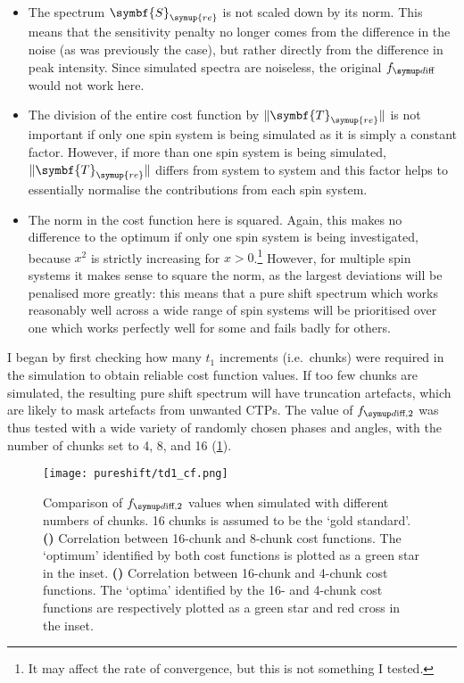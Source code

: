 \begin{itemize}
    \item The spectrum $\symbf{S}_{\symup{re}}$ is not scaled down by its norm. This means that the sensitivity penalty no longer comes from the difference in the noise (as was previously the case), but rather directly from the difference in peak intensity.
        Since simulated spectra are noiseless, the original $\fdiff$ would not work here.
    \item The division of the entire cost function by $\lVert\symbf{T}_{\symup{re}}\rVert$ is not important if only one spin system is being simulated as it is simply a constant factor.
        However, if more than one spin system is being simulated, $\lVert\symbf{T}_{\symup{re}}\rVert$ differs from system to system and this factor helps to essentially normalise the contributions from each spin system.
    \item The norm in the cost function here is squared.
        Again, this makes no difference to the optimum if only one spin system is being investigated, because $x^2$ is strictly increasing for $x > 0$.\footnote{It may affect the rate of convergence, but this is not something I tested.}
        However, for multiple spin systems it makes sense to square the norm, as the largest deviations will be penalised more greatly: this means that a pure shift spectrum which works reasonably well across a wide range of spin systems will be prioritised over one which works perfectly well for some and fails badly for others.
\end{itemize}

I began by first checking how many $t_1$ increments (i.e.\ chunks) were required in the simulation to obtain reliable cost function values.
If too few chunks are simulated, the resulting pure shift spectrum will have truncation artefacts, which are likely to mask artefacts from unwanted CTPs.
The value of $\fdifftwo$ was thus tested with a wide variety of randomly chosen phases and angles, with the number of chunks set to 4, 8, and 16 (\cref{fig:dpsyche_td1_cf}).

\begin{figure}[htb]
    \centering
    \texttt{[image: pureshift/td1\_cf.png]}%
    {\label{fig:dpsyche_td1_cf_16_8}}%
    {\label{fig:dpsyche_td1_cf_16_4}}%
    \caption[Comparison of $\fdifftwo$ cost function with different numbers of chunks]{
        Comparison of $\fdifftwo$ values when simulated with different numbers of chunks.
        16 chunks is assumed to be the `gold standard'.
        \textbf{()} Correlation between 16-chunk and 8-chunk cost functions.
        The `optimum' identified by both cost functions is plotted as a green star in the inset.
        \textbf{()} Correlation between 16-chunk and 4-chunk cost functions.
        The `optima' identified by the 16- and 4-chunk cost functions are respectively plotted as a green star and red cross in the inset.
    }
    \label{fig:dpsyche_td1_cf}
\end{figure}

